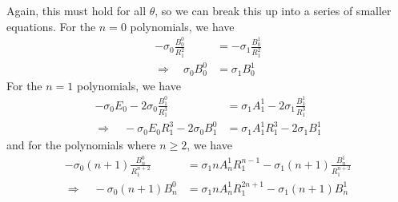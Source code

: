 Again, this must hold for all $\theta$, so we can break this up into a series of smaller equations. For the $n=0$ polynomials, we have
    \begin{equation}
    \begin{split}
        -\sigma_0 \frac{B_0^0}{R_1^2} &= -\sigma_1\frac{B_0^1}{R_1^2} \\
        \Rightarrow \quad
        \sigma_0 B_0^0 &= \sigma_1 B_0^1
        \end{split}
        \label{eq:coeff4}
    \end{equation}
For the $n=1$ polynomials, we have
    \begin{equation}
        \begin{split}
            - \sigma_0 E_0
            - 2 \sigma_0 \frac{B_1^0}{R_1^{3}}
            &= \sigma_1 A_1^1
            - 2 \sigma_1 \frac{B_1^1}{R_1^{3}} \\
             \Rightarrow \quad
            - \sigma_0 E_0 R_1^{3}
            - 2 \sigma_0 B_1^0
            &= \sigma_1 A_1^1 R_1^{3}
            - 2 \sigma_1 B_1^1
        \end{split}
        \label{eq:coeff5}
    \end{equation}
and for the polynomials where $n \geq 2$, we have
    \begin{equation}
    \begin{split}
            - \sigma_0 (n+1)\frac{B_n^0}{R_1^{n+2}}
            &=
            \sigma_1 nA_n^1R_1^{n-1} - \sigma_1 (n+1)\frac{B_n^1}{R_1^{n+2}}\\
             \Rightarrow \quad
            - \sigma_0 (n+1)B_n^0
            &=
            \sigma_1 nA_n^1R_1^{2n+1} - \sigma_1(n+1)B_n^1
    \end{split}
        \label{eq:coeff6}
    \end{equation}


